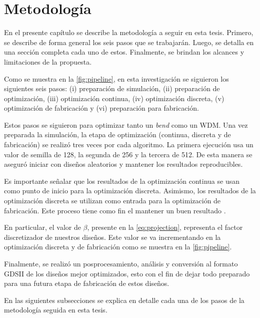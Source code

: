 \chapter{Metodología}\label{chapter:methodology}

En el presente capítulo se describe la metodología a seguir en esta tesis.
Primero, se describe de forma general los seis pasos que se trabajarán.
Luego, se detalla en una sección completa cada uno de estos.
Finalmente, se brindan los alcances y limitaciones de la propuesta.

Como se muestra en la \autoref{fig:pipeline}, en esta investigación se siguieron los siguientes seis pasos:
(i) preparación de simulación, 
(ii) preparación de optimización, 
(iii) optimización continua,
(iv) optimización discreta,
(v) optimización de fabricación y
(vi) preparación para fabricación.

Estos pasos se siguieron para optimizar tanto un \emph{bend} como un WDM.
Una vez preparada la simulación, la etapa de optimización (continua, discreta y de fabricación) se realizó
tres veces por cada algoritmo.
La primera ejecución usa un valor de semilla de 128, la segunda de 256 y la tercera de 512.
De esta manera se aseguró iniciar con diseños aleatorios y mantener los resultados reproducibles.

Es importante señalar que los resultados de la optimización continua se usan como punto de inicio
para la optimización discreta. Asimismo, los resultados de la optimización discreta se utilizan como
entrada para la optimización de fabricación.
Este proceso tiene como fin el mantener un buen resultado \citep{Yang2017}.


En particular, el valor de $\beta$, presente en la \autoref{eq:projection}, representa el factor discretizador de nuestros diseños.
Este valor se va incrementando en la optimización discreta y de fabricación como se muestra en la
\autoref{fig:pipeline}.

Finalmente, se realizó un posprocesamiento, análisis y conversión al
formato GDSII de los diseños mejor optimizados, esto con el fin de dejar todo preparado
para una futura etapa de fabricación de estos diseños.

En las siguientes subsecciones se explica en detalle cada una de los pasos de la metodología seguida en esta tesis.

